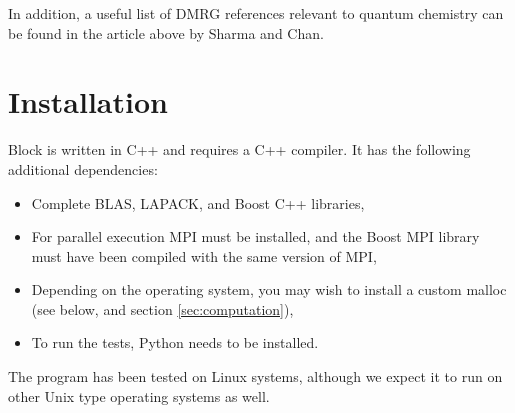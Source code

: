 \documentclass[letterpaper,12pt,aps, pra]{revtex4-1}
\begin{document}
In addition, a useful list of DMRG references relevant to quantum chemistry
can be found in the article above by Sharma and Chan.

\section{Installation}\label{sec:install}
Block is written in C++ and requires a C++ compiler. It has the following additional dependencies:
\begin{itemize}
\item Complete BLAS, LAPACK, and Boost C++ libraries,
\item For parallel execution MPI must be installed, and the Boost MPI library must have been compiled with the same version of MPI,
\item Depending on the operating system, you may wish to install a custom malloc (see below, and section \ref{sec:computation}),
\item To run the tests, Python needs to be installed.
\end{itemize}
The program has been tested on Linux systems, although we expect it to run on other Unix type operating systems as well. 
\end{document}
